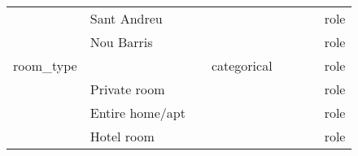 \begin{center}
\begin{longtable}{@{}llllllll@{}}
                            & Sant Andreu                 &                                   &             &                &                             &                     & role \\
                            & Nou Barris                  &                                   &             &                &                             &                     & role \\
room\_type                  &                             &                                   & categorical &                &                             &                     & role \\
                            & Private room                &                                   &             &                &                             &                     & role \\
                            & Entire home/apt  &                                   &             &                &                             &                     & role \\
                                                        & Hotel room  &                                   &             &                &                             &                     & role \\


\end{longtable}
\end{center}
